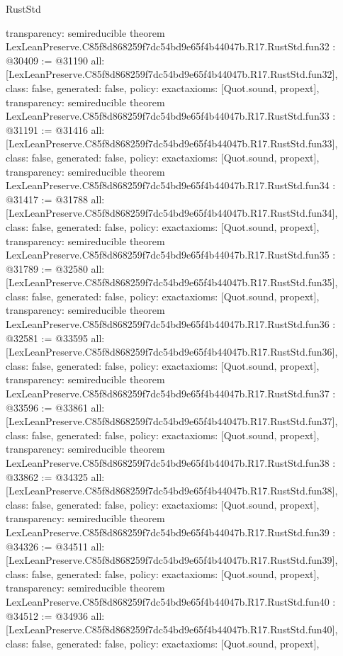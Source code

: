 \begin{lexlean}{RustStd}
\begin{coremodule}
{  transparency: semireducible
}
theorem LexLeanPreserve.C85f8d868259f7dc54bd9e65f4b44047b.R17.RustStd.fun32 : @30409 := @31190 {
  all: [LexLeanPreserve.C85f8d868259f7dc54bd9e65f4b44047b.R17.RustStd.fun32],
  class: false,
  generated: false,
  policy: exact{axioms: [Quot.sound, propext]},
  transparency: semireducible
}
theorem LexLeanPreserve.C85f8d868259f7dc54bd9e65f4b44047b.R17.RustStd.fun33 : @31191 := @31416 {
  all: [LexLeanPreserve.C85f8d868259f7dc54bd9e65f4b44047b.R17.RustStd.fun33],
  class: false,
  generated: false,
  policy: exact{axioms: [Quot.sound, propext]},
  transparency: semireducible
}
theorem LexLeanPreserve.C85f8d868259f7dc54bd9e65f4b44047b.R17.RustStd.fun34 : @31417 := @31788 {
  all: [LexLeanPreserve.C85f8d868259f7dc54bd9e65f4b44047b.R17.RustStd.fun34],
  class: false,
  generated: false,
  policy: exact{axioms: [Quot.sound, propext]},
  transparency: semireducible
}
theorem LexLeanPreserve.C85f8d868259f7dc54bd9e65f4b44047b.R17.RustStd.fun35 : @31789 := @32580 {
  all: [LexLeanPreserve.C85f8d868259f7dc54bd9e65f4b44047b.R17.RustStd.fun35],
  class: false,
  generated: false,
  policy: exact{axioms: [Quot.sound, propext]},
  transparency: semireducible
}
theorem LexLeanPreserve.C85f8d868259f7dc54bd9e65f4b44047b.R17.RustStd.fun36 : @32581 := @33595 {
  all: [LexLeanPreserve.C85f8d868259f7dc54bd9e65f4b44047b.R17.RustStd.fun36],
  class: false,
  generated: false,
  policy: exact{axioms: [Quot.sound, propext]},
  transparency: semireducible
}
theorem LexLeanPreserve.C85f8d868259f7dc54bd9e65f4b44047b.R17.RustStd.fun37 : @33596 := @33861 {
  all: [LexLeanPreserve.C85f8d868259f7dc54bd9e65f4b44047b.R17.RustStd.fun37],
  class: false,
  generated: false,
  policy: exact{axioms: [Quot.sound, propext]},
  transparency: semireducible
}
theorem LexLeanPreserve.C85f8d868259f7dc54bd9e65f4b44047b.R17.RustStd.fun38 : @33862 := @34325 {
  all: [LexLeanPreserve.C85f8d868259f7dc54bd9e65f4b44047b.R17.RustStd.fun38],
  class: false,
  generated: false,
  policy: exact{axioms: [Quot.sound, propext]},
  transparency: semireducible
}
theorem LexLeanPreserve.C85f8d868259f7dc54bd9e65f4b44047b.R17.RustStd.fun39 : @34326 := @34511 {
  all: [LexLeanPreserve.C85f8d868259f7dc54bd9e65f4b44047b.R17.RustStd.fun39],
  class: false,
  generated: false,
  policy: exact{axioms: [Quot.sound, propext]},
  transparency: semireducible
}
theorem LexLeanPreserve.C85f8d868259f7dc54bd9e65f4b44047b.R17.RustStd.fun40 : @34512 := @34936 {
  all: [LexLeanPreserve.C85f8d868259f7dc54bd9e65f4b44047b.R17.RustStd.fun40],
  class: false,
  generated: false,
  policy: exact{axioms: [Quot.sound, propext]},
}
\end{coremodule}
\end{lexlean}
